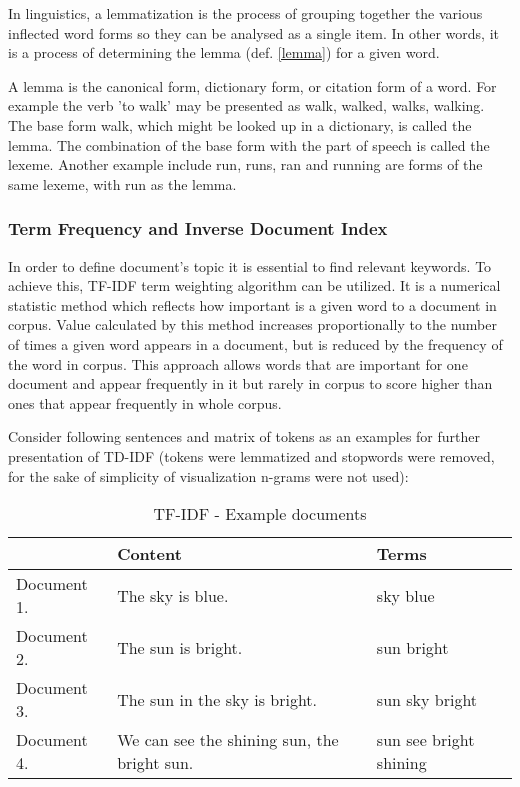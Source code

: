  \begin{definition}[Lemmatization]
 	\label{lemmatization}
In linguistics, a lemmatization is the process of grouping together the various inflected word forms so they can be analysed as a single item. In other words, it is a process of determining the lemma (def. \ref{lemma}) for a given word.\\
 \end{definition}
 
  \begin{definition}[Lemma]
  	\label{lemma}
  A lemma is the canonical form, dictionary form, or citation form of a word. For example the verb 'to walk' may be presented as walk, walked, walks, walking. The base form walk, which might be looked up in a dictionary, is called the lemma. The combination of the base form with the part of speech is called the lexeme. Another example include run, runs, ran and running are forms of the same lexeme, with run as the lemma. \\
  \end{definition}
  
 
\subsubsection{Term Frequency and Inverse Document Index}
In order to define document's topic it is essential to find relevant keywords. To achieve this, TF-IDF term weighting algorithm can be utilized. It is a numerical statistic method which reflects how important is a given word to a document in corpus. Value calculated by this method increases proportionally to the number of times a given word appears in a document, but is reduced by the frequency of the word in corpus. This approach allows words that are important for one document and appear frequently in it but rarely in corpus to score higher than ones that appear frequently in whole corpus.

Consider following sentences and matrix of tokens as an examples for further presentation of TD-IDF (tokens were lemmatized and stopwords were removed, for the sake of simplicity of visualization n-grams were not used):

\begin{table}[H]
	\centering
	\caption{TF-IDF - Example documents}
	\label{tf_idf_example_sentences}
	\begin{tabular}{@{}lll@{}}
		\toprule
		& Content                                     & Terms      \\ \midrule
		Document 1. & The sky is blue.                            & sky blue               \\
		Document 2. & The sun is bright.                          & sun bright             \\
		Document 3. & The sun in the sky is bright.               & sun sky bright         \\
		Document 4. & We can see the shining sun, the bright sun. & sun see bright shining \\ \bottomrule
	\end{tabular}
\end{table}

